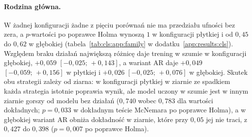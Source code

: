 \paragraph{Rodzina główna.}
W żadnej konfiguracji żadne z pięciu porównań nie ma przedziału ufności bez zera, a $p$-wartości po poprawce Holma wynoszą $1$ w konfiguracji płytkiej i od $0{,}45$ do $0{,}62$ w głębokiej (tabela~\ref{tab:cls:app:family} w dodatku~\ref{app:results:cls}).
Względem braku działań największą różnicę daje trening w szumie w konfiguracji głębokiej, $+0{,}059$ $[-0{,}025;\,+0{,}143]$, a wariant AR daje $+0{,}049$ $[-0{,}059;\,+0{,}156]$ w płytkiej i $+0{,}026$ $[-0{,}025;\,+0{,}076]$ w głębokiej.
Skutek obu strategii zależy od ziarna: w konfiguracji płytkiej w ziarnie ze spadkiem każda strategia istotnie poprawia wynik, ale model uczony w szumie jest w innym ziarnie gorszy od modelu bez działań ($0{,}740$ wobec $0{,}783$ dla wartości dokładnych; $p=0{,}033$ w dokładnym teście McNemara po poprawce Holma), a w głębokiej wariant AR obniża dokładność w ziarnie, które przy $0{,}05$ jej nie traci, z $0{,}427$ do $0{,}398$ ($p=0{,}007$ po poprawce Holma).

